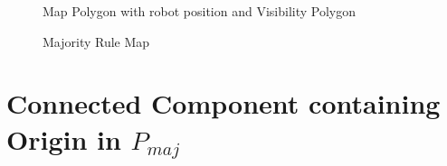\begin{figure}[h]
\begin{center}
\caption{\label{fig:Majority Rule Map}Map Polygon with robot position and Visibility Polygon}
\end{center}
\end{figure}

\begin{figure}[h]
\begin{center}
\caption{\label{fig:Majority Rule Map}Majority Rule Map}
\end{center}
\end{figure}


\section{Connected Component containing Origin in $P_{maj}$}


